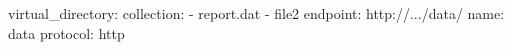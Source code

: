 virtual_directory:
  collection:
  - report.dat
  - file2
  endpoint: http://.../data/
  name: data
  protocol: http
